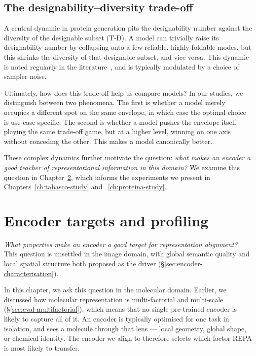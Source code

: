 \documentclass[12pt,a4paper,twoside]{report}
\begin{document}
\section{The designability--diversity trade-off}
\label{sec:protein-tradeoffs}

A central dynamic in protein generation pits the designability number against the diversity of the designable subset (T-D). A model can trivially raise its designability number by collapsing onto a few reliable, highly foldable modes, but this shrinks the diversity of that designable subset, and vice versa. This dynamic is noted regularly in the literature~\cite{Proteina}, and is typically modulated by a choice of sampler noise.

Ultimately, how does this trade-off help us compare models? In our studies, we distinguish between two phenomena. The first is whether a model merely occupies a different spot on the same envelope, in which case the optimal choice is use-case specific. The second is whether a model pushes the envelope itself --- playing the same trade-off game, but at a higher level, winning on one axis without conceding the other. This makes a model canonically better.

These complex dynamics further motivate the question: \emph{what makes an encoder a good teacher of representational information in this domain?} We examine this question in Chapter~\ref{ch:profiling}, which informs the experiments we present in Chapters~\ref{ch:tabasco-study} and ~\ref{ch:proteina-study}.

\chapter{Encoder targets and profiling}
\label{ch:profiling}


\emph{What properties make an encoder a good target for representation alignment?} This question is unsettled in the image domain, with global semantic quality and local spatial structure both proposed as the driver (\S\ref{sec:encoder-characterisation}).

In this chapter, we ask this question in the molecular domain. Earlier, we discussed how molecular representation is multi-factorial and multi-scale (\S\ref{sec:eval-multifactorial}), which means that no single pre-trained encoder is likely to capture all of it. An encoder is typically optimised for one task in isolation, and sees a molecule through that lens --- local geometry, global shape, or chemical identity. The encoder we align to therefore selects which factor REPA is most likely to transfer.
\end{document}
